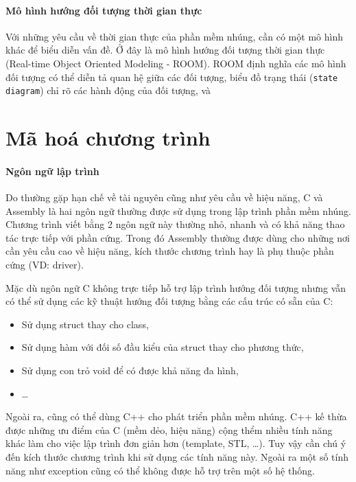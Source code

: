             \paragraph{Mô hình hướng đối tượng thời gian thực}
                Với những yêu cầu về thời gian thực của phần mềm nhúng, cần có
                một mô hình khác để biểu diễn vấn đề. Ở đây là mô hình hướng
                đối tượng thời gian thực (Real-time Object Oriented Modeling -
                ROOM). ROOM định nghĩa các mô hình đối tượng có thể diễn tả
                quan hệ giữa các đối tượng, biểu đồ trạng thái (\texttt{state
                diagram}) chỉ rõ các hành động của đối tượng, và 

    \section{Mã hoá chương trình}
        \paragraph{Ngôn ngữ lập trình}
            Do thường gặp hạn chế về tài nguyên cũng như yêu cầu về hiệu năng,
            C và Assembly là hai ngôn ngữ thường được sử dụng trong lập trình
            phần mềm nhúng. Chương trình viết bằng 2 ngôn ngữ này thường nhỏ,
            nhanh và có khả năng thao tác trực tiếp với phần cứng. Trong đó
            Assembly thường được dùng cho những nơi cần yêu cầu cao về hiệu
            năng, kích thước chương trình hay là phụ thuộc phần cứng (VD:
            driver).

            Mặc dù ngôn ngữ C không trực tiếp hỗ trợ lập trình hướng đối tượng
            nhưng vẫn có thể sử dụng các kỹ thuật hướng đối tượng bằng các cấu
            trúc có sẵn của C:
            \begin{itemize}
                \item Sử dụng struct thay cho class,
                \item Sử dụng hàm với đối số đầu kiểu của struct thay
                    cho phương thức,
                \item Sử dụng con trỏ void để có được khả năng đa hình,
                \item \ldots
            \end{itemize}


            Ngoài ra, cũng có thể dùng C++ cho phát triển phần mềm nhúng. C++
            kế thừa được những ưu điểm của C (mềm dẻo, hiệu năng) cộng thểm
            nhiều tính năng khác làm cho việc lập trình đơn giản hơn (template,
            STL, \ldots). Tuy vậy cần chú ý đến kích thước chương trình khi sử
            dụng các tính năng này. Ngoài ra một số tính năng như exception
            cũng có thể không được hỗ trợ trên một số hệ thống.

